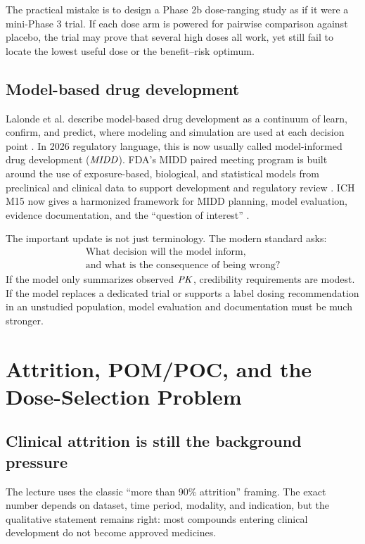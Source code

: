 \documentclass[a4paper]{article}
\newcommand{\MIDD}{\ensuremath{\pksym{MIDD}}}
\newcommand{\PK}{\ensuremath{\pksym{PK}}}
\begin{document}
\begin{remark}
  The practical mistake is to design a Phase 2b dose-ranging study as if it were a mini-Phase 3 trial. If each dose arm is powered for pairwise comparison against placebo, the trial may prove that several high doses all work, yet still fail to locate the lowest useful dose or the benefit--risk optimum.
\end{remark}

\subsection{Model-based drug development}

Lalonde et al. describe model-based drug development as a continuum of learn, confirm, and predict, where modeling and simulation are used at each decision point \cite{lalonde2007model}. In 2026 regulatory language, this is now usually called model-informed drug development (\MIDD). FDA's MIDD paired meeting program is built around the use of exposure-based, biological, and statistical models from preclinical and clinical data to support development and regulatory review \cite{fdaMiddProgram2026}. ICH M15 now gives a harmonized framework for MIDD planning, model evaluation, evidence documentation, and the ``question of interest'' \cite{ichM15Midd2026}.

The important update is not just terminology. The modern standard asks:
\[
  \begin{gathered}
    \text{What decision will the model inform,}\\
    \text{and what is the consequence of being wrong?}
  \end{gathered}
\]
If the model only summarizes observed \PK, credibility requirements are modest. If the model replaces a dedicated trial or supports a label dosing recommendation in an unstudied population, model evaluation and documentation must be much stronger.

\section{Attrition, POM/POC, and the Dose-Selection Problem}

\subsection{Clinical attrition is still the background pressure}

The lecture uses the classic ``more than 90\% attrition'' framing. The exact number depends on dataset, time period, modality, and indication, but the qualitative statement remains right: most compounds entering clinical development do not become approved medicines.
\end{document}
